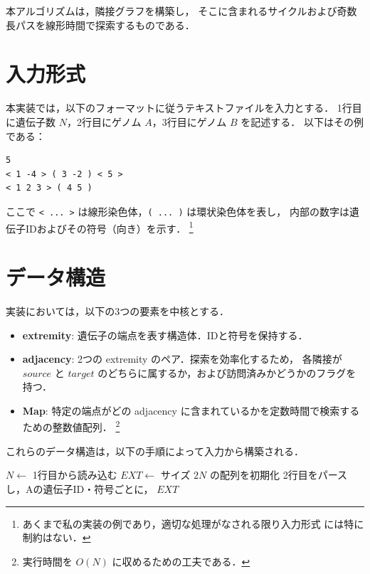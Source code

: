 \documentclass[paper=a4,fontsize=11pt,report,oneside]{jlreq}
\begin{document}
本アルゴリズムは，隣接グラフを構築し，
そこに含まれるサイクルおよび奇数長パスを線形時間で探索するものである．

\section{入力形式}
本実装では，以下のフォーマットに従うテキストファイルを入力とする．
1行目に遺伝子数 $N$，2行目にゲノム $A$，3行目にゲノム $B$ を記述する．
以下はその例である：

\begin{verbatim}
5
< 1 -4 > ( 3 -2 ) < 5 >
< 1 2 3 > ( 4 5 )
\end{verbatim}

ここで \texttt{< ... >} は線形染色体，\texttt{( ... )} は環状染色体を表し，
内部の数字は遺伝子IDおよびその符号（向き）を示す．
\footnote{
    あくまで私の実装の例であり，適切な処理がなされる限り入力形式
    には特に制約はない．
}

\section{データ構造}
実装においては，以下の3つの要素を中核とする．
\begin{itemize}
    \item \textbf{extremity}: 遺伝子の端点を表す構造体．IDと符号を保持する．
    \item \textbf{adjacency}: 2つの extremity のペア．探索を効率化するため，
    各隣接が $source$ と $target$ のどちらに属するか，および訪問済みかどうかのフラグを持つ．
    \item \textbf{Map}: 特定の端点がどの adjacency に含まれているかを定数時間で検索するための整数値配列．
    \footnote{
        実行時間を $O(N)$ に収めるための工夫である．
    }
\end{itemize}

これらのデータ構造は，以下の手順によって入力から構築される．


\begin{algorithm}[H]
    \caption{EXT配列（端点配列）の構築}

    $N \leftarrow$ 1行目から読み込む\;
    $EXT \leftarrow$ サイズ $2N$ の配列を初期化\;
    2行目をパースし，Aの遺伝子ID・符号ごとに，
    \Return $EXT$\;
\end{algorithm}
\end{document}
